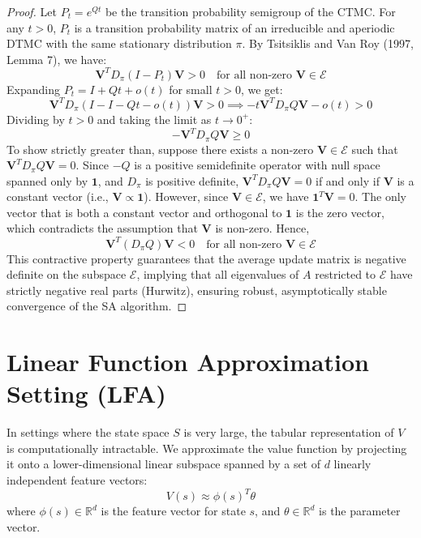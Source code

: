 \documentclass[11pt]{article}
\begin{document}
\begin{proof}
Let $P_t = e^{Qt}$ be the transition probability semigroup of the CTMC. For any $t > 0$, $P_t$ is a transition probability matrix of an irreducible and aperiodic DTMC with the same stationary distribution $\pi$. By Tsitsiklis and Van Roy (1997, Lemma 7), we have:
\begin{equation}
    \mathbf{V}^T D_\pi (I - P_t) \mathbf{V} > 0 \quad \text{for all non-zero } \mathbf{V} \in \mathcal{E}
\end{equation}
Expanding $P_t = I + Q t + o(t)$ for small $t > 0$, we get:
\begin{equation}
    \mathbf{V}^T D_\pi (I - I - Q t - o(t)) \mathbf{V} > 0 \implies -t \mathbf{V}^T D_\pi Q \mathbf{V} - o(t) > 0
\end{equation}
Dividing by $t > 0$ and taking the limit as $t \to 0^+$:
\begin{equation}
    -\mathbf{V}^T D_\pi Q \mathbf{V} \ge 0
\end{equation}
To show strictly greater than, suppose there exists a non-zero $\mathbf{V} \in \mathcal{E}$ such that $\mathbf{V}^T D_\pi Q \mathbf{V} = 0$. Since $-Q$ is a positive semidefinite operator with null space spanned only by $\mathbf{1}$, and $D_\pi$ is positive definite, $\mathbf{V}^T D_\pi Q \mathbf{V} = 0$ if and only if $\mathbf{V}$ is a constant vector (i.e., $\mathbf{V} \propto \mathbf{1}$). However, since $\mathbf{V} \in \mathcal{E}$, we have $\mathbf{1}^T \mathbf{V} = 0$. The only vector that is both a constant vector and orthogonal to $\mathbf{1}$ is the zero vector, which contradicts the assumption that $\mathbf{V}$ is non-zero.
Hence,
\begin{equation}
    \mathbf{V}^T (D_\pi Q) \mathbf{V} < 0 \quad \text{for all non-zero } \mathbf{V} \in \mathcal{E}
\end{equation}
This contractive property guarantees that the average update matrix is negative definite on the subspace $\mathcal{E}$, implying that all eigenvalues of $A$ restricted to $\mathcal{E}$ have strictly negative real parts (Hurwitz), ensuring robust, asymptotically stable convergence of the SA algorithm.
\end{proof}

\section{Linear Function Approximation Setting (LFA)}

In settings where the state space $S$ is very large, the tabular representation of $V$ is computationally intractable. We approximate the value function by projecting it onto a lower-dimensional linear subspace spanned by a set of $d$ linearly independent feature vectors:
\begin{equation}
    V(s) \approx \phi(s)^T \theta
\end{equation}
where $\phi(s) \in \mathbb{R}^d$ is the feature vector for state $s$, and $\theta \in \mathbb{R}^d$ is the parameter vector.
\end{document}
